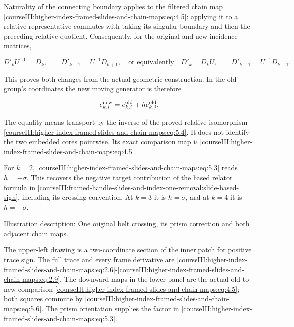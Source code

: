 Naturality of the connecting boundary applies to the filtered chain map \eqref{courseIII:higher-index-framed-slides-and-chain-maps:eq:4.5}: applying it to a relative representative commutes with taking its singular boundary and then the preceding relative quotient. Consequently, for the original and new incidence matrices,

\begin{equation}
D'_k U^{-1}=D_k,\qquad
 D'_{k+1}=U^{-1}D_{k+1},
 \quad\text{or equivalently}\quad
 D'_k=D_kU,\qquad D'_{k+1}=U^{-1}D_{k+1}.
 \label{courseIII:higher-index-framed-slides-and-chain-maps:eq:5.6}
\end{equation}

This proves both changes from the actual geometric construction. In the old group's coordinates the new moving generator is therefore

\begin{equation}
e_{k,i}^{\rm new}=e_{k,i}^{\rm old}+h e_{k,j}^{\rm old}.
 \label{courseIII:higher-index-framed-slides-and-chain-maps:eq:5.7}
\end{equation}

The equality means transport by the inverse of the proved relative isomorphism \eqref{courseIII:higher-index-framed-slides-and-chain-maps:eq:5.4}. It does not identify the two embedded cores pointwise. Its exact comparison map is \eqref{courseIII:higher-index-framed-slides-and-chain-maps:eq:4.5}.

For \(k=2\), \eqref{courseIII:higher-index-framed-slides-and-chain-maps:eq:5.3} reads \(h=-\sigma\). This recovers the negative target contribution of the based relator formula in \cref{courseIII:framed-handle-slides-and-index-one-removal:slide-based-sign}, including its crossing convention. At \(k=3\) it is \(h=\sigma\), and at \(k=4\) it is \(h=-\sigma\).

Illustration description: One original belt crossing, its prism correction and both adjacent chain maps.

The upper-left drawing is a two-coordinate section of the inner patch for positive trace sign. The full trace and every frame derivative are \eqref{courseIII:higher-index-framed-slides-and-chain-maps:eq:2.6}-\eqref{courseIII:higher-index-framed-slides-and-chain-maps:eq:2.9}. The downward maps in the lower panel are the actual old-to-new comparison \eqref{courseIII:higher-index-framed-slides-and-chain-maps:eq:4.5}; both squares commute by \eqref{courseIII:higher-index-framed-slides-and-chain-maps:eq:5.6}. The prism orientation supplies the factor in \eqref{courseIII:higher-index-framed-slides-and-chain-maps:eq:5.3}.

